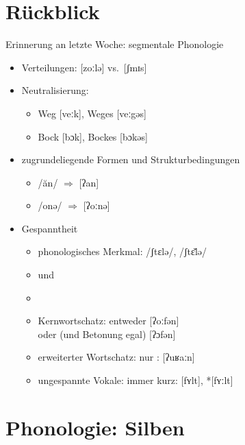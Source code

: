 
\section{Rückblick}

\begin{frame}
  {Erinnerung an letzte Woche: segmentale Phonologie}
  \pause
  \begin{itemize}[<+->]
    \item Verteilungen: [zoːlə] vs.\ [ʃmɪs]
    \item Neutralisierung:
      \begin{itemize}[<+->]
        \item  Weg [veːk], Weges [veːgəs]
        \item Bock [bɔk], Bockes [bɔkəs]
      \end{itemize}
    \item zugrundeliegende Formen und Strukturbedingungen
      \begin{itemize}[<+->]
        \item /ăn/ $\Rightarrow$ [ʔan]
        \item /onə/ $\Rightarrow$ [ʔoːnə] 
      \end{itemize}
    \item Gespanntheit
      \begin{itemize}[<+->]
        \item \alert{phonologisches} Merkmal: /ʃtɛlə/, /ʃtɛ̆lə/
        \item {} und 
        \item {}
        \item Kernwortschatz: entweder  [ʔoːfən]\\
          oder  (und Betonung egal) [ʔɔfən]
        \item erweiterter Wortschatz: \alert{nur} : [ʔuʁaːn]
        \item ungespannte Vokale: immer kurz: [fʏlt], *[fʏːlt]
      \end{itemize}
  \end{itemize}
\end{frame}


\section{Phonologie: Silben}

